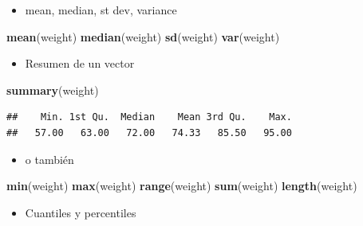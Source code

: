 \documentclass[]{book}
\newenvironment{Shaded}{\begin{snugshade}}{\end{snugshade}}
\newcommand{\KeywordTok}[1]{\textcolor[rgb]{0.13,0.29,0.53}{\textbf{#1}}}
\newcommand{\CommentTok}[1]{\textcolor[rgb]{0.56,0.35,0.01}{\textit{#1}}}
\newcommand{\NormalTok}[1]{#1}
\providecommand{\tightlist}{%
  \setlength{\itemsep}{0pt}\setlength{\parskip}{0pt}}
\begin{document}
\begin{itemize}
\tightlist
\item
  mean, median, st dev, variance
\end{itemize}

\begin{Shaded}
\begin{Highlighting}[]
\KeywordTok{mean}\NormalTok{(weight) }
\KeywordTok{median}\NormalTok{(weight)}
\KeywordTok{sd}\NormalTok{(weight)}
\KeywordTok{var}\NormalTok{(weight)}
\end{Highlighting}
\end{Shaded}

\begin{itemize}
\tightlist
\item
  Resumen de un vector
\end{itemize}

\begin{Shaded}
\begin{Highlighting}[]
\KeywordTok{summary}\NormalTok{(weight)}
\end{Highlighting}
\end{Shaded}

\begin{verbatim}
##    Min. 1st Qu.  Median    Mean 3rd Qu.    Max. 
##   57.00   63.00   72.00   74.33   85.50   95.00
\end{verbatim}

\begin{itemize}
\tightlist
\item
  o también
\end{itemize}

\begin{Shaded}
\begin{Highlighting}[]
\KeywordTok{min}\NormalTok{(weight)}
\KeywordTok{max}\NormalTok{(weight)}
\KeywordTok{range}\NormalTok{(weight)}
\KeywordTok{sum}\NormalTok{(weight)}
\KeywordTok{length}\NormalTok{(weight)}
\end{Highlighting}
\end{Shaded}

\begin{itemize}
\tightlist
\item
  Cuantiles y percentiles
\end{itemize}

\begin{Shaded}
\end{Shaded}
\end{document}
